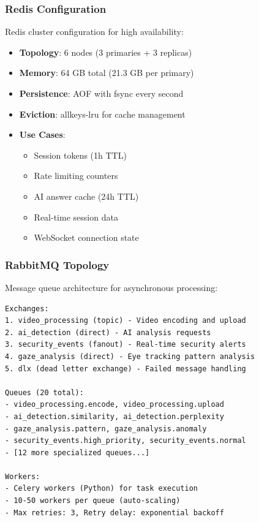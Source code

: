 \documentclass[11pt,letterpaper]{article}
\begin{document}
\subsubsection{Redis Configuration}

Redis cluster configuration for high availability:

\begin{itemize}[noitemsep]
    \item \textbf{Topology}: 6 nodes (3 primaries + 3 replicas)
    \item \textbf{Memory}: 64 GB total (21.3 GB per primary)
    \item \textbf{Persistence}: AOF with fsync every second
    \item \textbf{Eviction}: allkeys-lru for cache management
    \item \textbf{Use Cases}:
    \begin{itemize}
        \item Session tokens (1h TTL)
        \item Rate limiting counters
        \item AI answer cache (24h TTL)
        \item Real-time session data
        \item WebSocket connection state
    \end{itemize}
\end{itemize}

\subsubsection{RabbitMQ Topology}

Message queue architecture for asynchronous processing:

\begin{lstlisting}[caption=RabbitMQ Exchanges and Queues]
Exchanges:
1. video_processing (topic) - Video encoding and upload
2. ai_detection (direct) - AI analysis requests
3. security_events (fanout) - Real-time security alerts
4. gaze_analysis (direct) - Eye tracking pattern analysis
5. dlx (dead letter exchange) - Failed message handling

Queues (20 total):
- video_processing.encode, video_processing.upload
- ai_detection.similarity, ai_detection.perplexity
- gaze_analysis.pattern, gaze_analysis.anomaly
- security_events.high_priority, security_events.normal
- [12 more specialized queues...]

Workers:
- Celery workers (Python) for task execution
- 10-50 workers per queue (auto-scaling)
- Max retries: 3, Retry delay: exponential backoff
\end{lstlisting}
\end{document}
